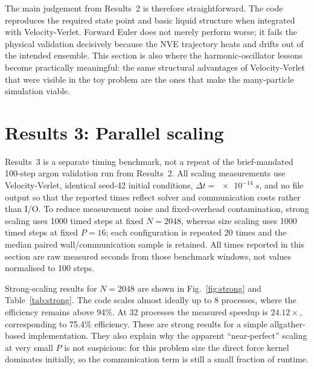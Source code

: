\documentclass[10pt,twocolumn]{article}
\begin{document}
The main judgement from Results~2 is therefore straightforward. The code reproduces the required state point and basic liquid structure when integrated with Velocity-Verlet. Forward Euler does not merely perform worse; it fails the physical validation decisively because the NVE trajectory heats and drifts out of the intended ensemble. This section is also where the harmonic-oscillator lessons become practically meaningful: the same structural advantages of Velocity-Verlet that were visible in the toy problem are the ones that make the many-particle simulation viable.

\FloatBarrier
\section{Results 3: Parallel scaling}

Results~3 is a separate timing benchmark, not a repeat of the brief-mandated 100-step argon validation run from Results~2. All scaling measurements use Velocity-Verlet, identical seed-42 initial conditions, $\Delta t=\SI{e-14}{s}$, and no file output so that the reported times reflect solver and communication costs rather than I/O. To reduce measurement noise and fixed-overhead contamination, strong scaling uses 1000 timed steps at fixed $N=2048$, whereas size scaling uses 1000 timed steps at fixed $P=16$; each configuration is repeated 20 times and the median paired wall/communication sample is retained. All times reported in this section are raw measured seconds from those benchmark windows, not values normalised to 100 steps.

Strong-scaling results for $N=2048$ are shown in Fig.~\ref{fig:strong} and Table~\ref{tab:strong}. The code scales almost ideally up to 8 processes, where the efficiency remains above 94\%. At 32 processes the measured speedup is $24.12\times$, corresponding to 75.4\% efficiency. These are strong results for a simple allgather-based implementation. They also explain why the apparent ``near-perfect'' scaling at very small $P$ is not suspicious: for this problem size the direct force kernel dominates initially, so the communication term is still a small fraction of runtime.
\end{document}
